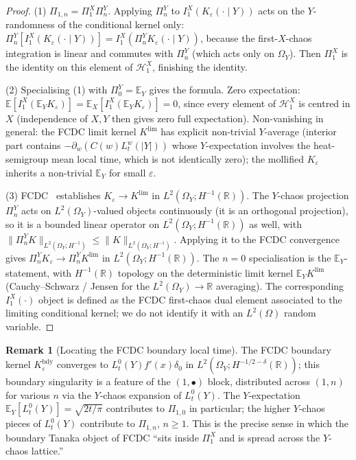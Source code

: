 \documentclass[11pt,reqno]{amsart}
\theoremstyle{plain}
\theoremstyle{definition}
\newtheorem{remark}[theorem]{Remark}
\theoremstyle{remark}
\newcommand{\R}{\mathbb{R}}
\newcommand{\E}{\mathbb{E}}
\newcommand{\Hilb}{\mathcal{H}}
\newcommand{\Pir}{\Pi}
\begin{document}
\begin{proof}
(1) $\Pir_{1,n}=\Pir_1^X\Pir_n^Y$. Applying $\Pir_n^Y$ to
$I_1^X(K_\varepsilon(\cdot\mid Y))$ acts on the $Y$-randomness of
the conditional kernel only:
$\Pir_n^Y[I_1^X(K_\varepsilon(\cdot\mid Y))]=I_1^X(\Pir_n^Y K_\varepsilon(\cdot\mid Y))$,
because the first-$X$-chaos integration is linear and commutes with
$\Pir_n^Y$ (which acts only on $\Omega_Y$). Then
$\Pir_1^X$ is the identity on this element of $\Hilb_1^X$,
finishing the identity.

(2) Specialising (1) with $\Pir_0^Y=\E_Y$ gives the formula.
Zero expectation:
$\E[I_1^X(\E_Y K_\varepsilon)]=\E_X[I_1^X(\E_Y K_\varepsilon)]=0$,
since every element of $\Hilb_1^X$ is centred in $X$ (independence
of $X,Y$ then gives zero full expectation). Non-vanishing in general:
the FCDC limit kernel $K^{\mathrm{lim}}$ has explicit non-trivial
$Y$-average (interior part contains
$-\partial_w(C(w)L_t^w(|Y|))$ whose $Y$-expectation involves the
heat-semigroup mean local time, which is not identically zero); the
mollified $K_\varepsilon$ inherits a non-trivial $\E_Y$ for small
$\varepsilon$.

(3) FCDC~\cite[Thm.\ 5.3]{Fontes-FCDC} establishes
$K_\varepsilon\to K^{\mathrm{lim}}$ in
$L^{2}(\Omega_Y;H^{-1}(\R))$. The $Y$-chaos projection $\Pir_n^Y$
acts on $L^{2}(\Omega_Y)$-valued objects continuously
(it is an orthogonal projection), so it is a bounded linear operator
on $L^{2}(\Omega_Y;H^{-1}(\R))$ as well, with
$\|\Pir_n^Y K\|_{L^{2}(\Omega_Y;H^{-1})}\le\|K\|_{L^{2}(\Omega_Y;H^{-1})}$.
Applying it to the FCDC convergence gives
$\Pir_n^Y K_\varepsilon\to\Pir_n^Y K^{\mathrm{lim}}$ in
$L^{2}(\Omega_Y;H^{-1}(\R))$. The $n=0$ specialisation is the
$\E_Y$-statement, with $H^{-1}(\R)$ topology on the deterministic
limit kernel $\E_Y K^{\mathrm{lim}}$ (Cauchy--Schwarz / Jensen for
the $L^{2}(\Omega_Y)\to\R$ averaging). The corresponding
$I_1^X(\cdot)$ object is defined as the FCDC first-chaos dual
element associated to the limiting conditional kernel; we do not
identify it with an $L^{2}(\Omega)$ random variable.
\end{proof}

\begin{remark}[Locating the FCDC boundary local time]
\label{rem:bdy-local-time}
The FCDC boundary kernel $K_\varepsilon^{\mathrm{bdy}}$ converges to
$L_t^0(Y)f'(x)\delta_0$ in $L^{2}(\Omega_Y;H^{-1/2-\delta}(\R))$;
this boundary singularity is a feature of the $(1,\bullet)$ block,
distributed across $(1,n)$ for various $n$ via the $Y$-chaos
expansion of $L_t^0(Y)$. The $Y$-expectation
$\E_Y[L_t^0(Y)]=\sqrt{2t/\pi}$ contributes to $\Pir_{1,0}$ in
particular; the higher $Y$-chaos pieces of $L_t^0(Y)$ contribute to
$\Pir_{1,n}$, $n\ge 1$. This is the precise sense in which the
boundary Tanaka object of FCDC ``sits inside $\Pir_1^X$ and is
spread across the $Y$-chaos lattice.''
\end{remark}
\end{document}
